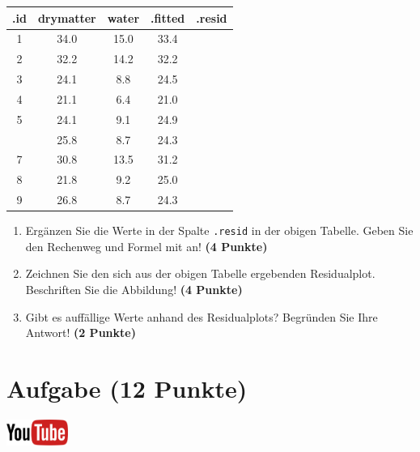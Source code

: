 \documentclass[a4paper, 9pt]{scrartcl}\usepackage[]{graphicx}\usepackage[]{xcolor}
\newenvironment{knitrout}{}{} %
\begin{document}
\begin{knitrout}
\color{fgcolor}\begin{table}[!h]
\centering\begingroup\fontsize{12}{14}\selectfont

\begin{tabular}{ccccc}
\toprule
.id & drymatter & water & .fitted & .resid\\
\midrule
1 & 34.0 & 15.0 & 33.4 & \\
2 & 32.2 & 14.2 & 32.2 & \\
3 & 24.1 & 8.8 & 24.5 & \\
4 & 21.1 & 6.4 & 21.0 & \\
5 & 24.1 & 9.1 & 24.9 & \\
\addlinespace
6 & 25.8 & 8.7 & 24.3 & \\
7 & 30.8 & 13.5 & 31.2 & \\
8 & 21.8 & 9.2 & 25.0 & \\
9 & 26.8 & 8.7 & 24.3 & \\
\bottomrule
\end{tabular}
\endgroup{}
\end{table}

\end{knitrout}

\begin{enumerate}
\item Erg{\"a}nzen Sie die Werte in der Spalte \texttt{.resid} in der obigen
  Tabelle. Geben Sie den Rechenweg und Formel mit an! \textbf{(4 Punkte)}
\item Zeichnen Sie den sich aus der obigen Tabelle ergebenden
  Residualplot. Beschriften Sie die Abbildung! \textbf{(4 Punkte)}
\item Gibt es auff{\"a}llige Werte anhand des Residualplots? Begr{\"u}nden Sie Ihre
  Antwort! \textbf{(2 Punkte)}
\end{enumerate}
 
\clearpage

\section{Aufgabe \hfill (12 Punkte)}

\hfill\href{https://youtu.be/lHzRgm7hPw0}{\includegraphics[width =
  2cm]{img/youtube}}\\[1Ex]
\end{document}
